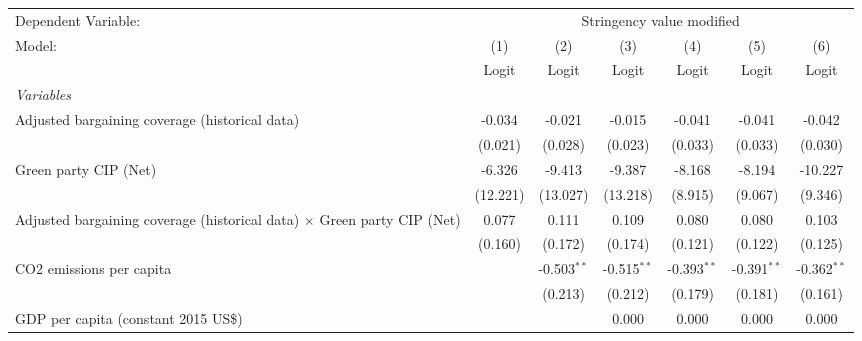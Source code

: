 
\begingroup
\centering
\begin{tabular}{lcccccc}
   \toprule
   Dependent Variable: & \multicolumn{6}{c}{Stringency value modified}\\
   Model:                                                                         & (1)      & (2)           & (3)           & (4)           & (5)           & (6)\\  
                                                                                  &  Logit   & Logit         & Logit         & Logit         & Logit         & Logit\\  
   \midrule
   \emph{Variables}\\
   Adjusted bargaining coverage (historical data)                                 & -0.034   & -0.021        & -0.015        & -0.041        & -0.041        & -0.042\\   
                                                                                  & (0.021)  & (0.028)       & (0.023)       & (0.033)       & (0.033)       & (0.030)\\   
   Green party CIP (Net)                                                          & -6.326   & -9.413        & -9.387        & -8.168        & -8.194        & -10.227\\   
                                                                                  & (12.221) & (13.027)      & (13.218)      & (8.915)       & (9.067)       & (9.346)\\   
   Adjusted bargaining coverage (historical data) $\times$ Green party CIP (Net)  & 0.077    & 0.111         & 0.109         & 0.080         & 0.080         & 0.103\\   
                                                                                  & (0.160)  & (0.172)       & (0.174)       & (0.121)       & (0.122)       & (0.125)\\   
   CO2 emissions per capita                                                       &          & -0.503$^{**}$ & -0.515$^{**}$ & -0.393$^{**}$ & -0.391$^{**}$ & -0.362$^{**}$\\   
                                                                                  &          & (0.213)       & (0.212)       & (0.179)       & (0.181)       & (0.161)\\   
   GDP per capita (constant 2015 US\$)                                            &          &               & 0.000         & 0.000         & 0.000         & 0.000\\   

\end{tabular}
